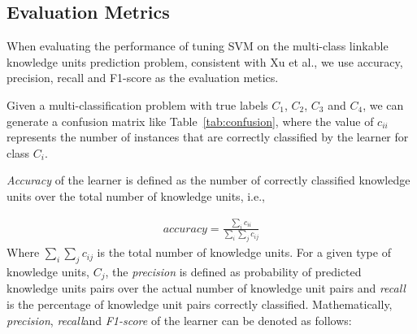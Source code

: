 \documentclass[sigconf,review, anonymous]{acmart}
\theoremstyle{break}
\newcommand{\tab}[1]{Table~\ref{tab:#1}}
\begin{document}
\subsection{Evaluation Metrics}
When evaluating the performance of tuning SVM on the
multi-class linkable knowledge units prediction problem,
consistent with Xu et al.\cite{xu2016predicting}, we use accuracy, precision, recall and F1-score
as the evaluation metics.

\begin{table}[htp]
\caption {Confusion Matrix.}
\scriptsize
{}

\label{tab:confusion}
\end{table}

Given a multi-classification problem with true labels $C_1$, 
$C_2$, $C_3$ and $C_4$, we can generate a confusion matrix like \tab{confusion}, 
where the value of $c_{ii}$ represents the number of instances that are correctly classified
by the learner for class $C_i$. 

{\it Accuracy} of the learner is defined as the number of  correctly
classified knowledge units over the total number of knowledge units, i.e.,


{\[
\begin{array}{ll}
accuracy = \frac{\sum_i c_{ii}}{\sum_{i}\sum_{j}c_{ij}}
\end{array}
\]}
Where ${\sum_{i}\sum_{j}c_{ij}}$ is the total number of knowledge units.
For a given type of knowledge units, $C_j$, the {\it precision} is defined as probability of
predicted knowledge units pairs over the actual number of knowledge unit pairs and
 {\it recall} is the percentage of knowledge unit pairs correctly classified. Mathematically,
  {\it precision}, {\it recall}and {\it F1-score} of 
the learner can be denoted as follows:
\end{document}

